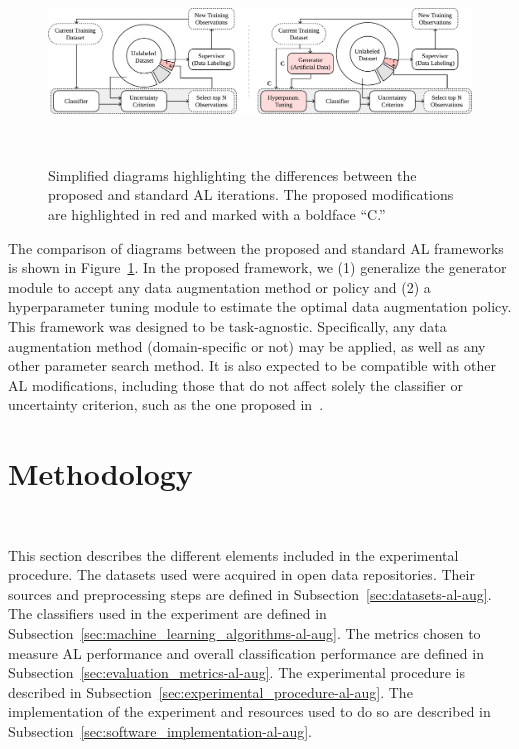 \begin{figure}
	\centering
	\includegraphics[width=\linewidth]{al_comparison}
    \caption[Simplified diagrams highlighting the differences between the
        proposed and standard AL iterations.]{%
        Simplified diagrams highlighting the differences between the proposed
        and standard AL iterations. The proposed modifications are highlighted
        in red and marked with a boldface ``C.''
    }~\label{fig:al_comparison}
\end{figure}

The comparison of diagrams between the proposed and standard AL frameworks is
shown in Figure~\ref{fig:al_comparison}. In the proposed framework, we (1)
generalize the generator module to accept any data augmentation method or
policy and (2) a hyperparameter tuning module to estimate the optimal data
augmentation policy. This framework was designed to be task-agnostic.
Specifically, any data augmentation method (domain-specific or not) may
be applied, as well as any other parameter search method. It is also expected to
be compatible with other AL modifications, including those that do not
affect solely the classifier or uncertainty criterion, such as the one
proposed in~\cite{Yoo2019}.
 
\section{Methodology}~\label{sec:methodology-al-aug}

This section describes the different elements included in the experimental
procedure. The datasets used were acquired in open data repositories.
Their sources and preprocessing steps are defined in
Subsection~\ref{sec:datasets-al-aug}. The classifiers used in the experiment are
defined in Subsection~\ref{sec:machine_learning_algorithms-al-aug}. The metrics
chosen to measure AL performance and overall classification performance are
defined in Subsection~\ref{sec:evaluation_metrics-al-aug}. The experimental procedure
is described in Subsection~\ref{sec:experimental_procedure-al-aug}. The
implementation of the experiment and resources used to do so are described in
Subsection~\ref{sec:software_implementation-al-aug}.

